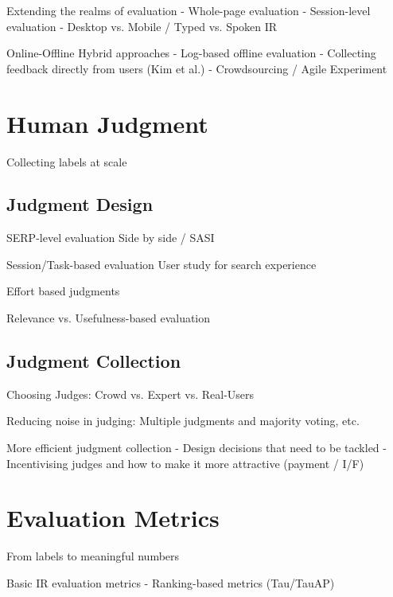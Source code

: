 \documentclass[openany]{now} %
\begin{document}

Extending the realms of evaluation
-	Whole-page evaluation
-	Session-level evaluation
-	Desktop vs. Mobile / Typed vs. Spoken IR
\cite{Bailey2010} \cite{Thomas2006} \cite{CarteretteBCD08}

Online-Offline Hybrid approaches
- Log-based offline evaluation \cite{Li:2015} \cite{li2010contextual}
- Collecting feedback directly from users (Kim et al.)
- Crowdsourcing / Agile Experiment

\chapter{Human Judgment}
Collecting labels at scale

\section{Judgment Design}

SERP-level evaluation 
Side by side / SASI
\cite{Thomas2006}
\cite{Chandar2013} \cite{Al-Maskari2007} 
\cite{Bailey2010} \cite{CarteretteBCD08}

Session/Task-based evaluation
User study for search experience

Effort based judgments \cite{Yilmaz:2014}

Relevance vs. Usefulness-based evaluation 

\section{Judgment Collection}

Choosing Judges: 
Crowd vs. Expert vs. Real-Users \cite{Scholer:2013} \cite{Kazai:2013} \cite{Alonso20121053}

Reducing noise in judging: 
Multiple judgments and majority voting, etc. \cite{Venanzi:2014}

More efficient judgment collection
-	Design decisions that need to be tackled  \cite{Blanco:2011} \cite{Kazai2012} \cite{Alonso2012} \cite{Alonso:2015}
-	Incentivising judges and how to make it more attractive (payment / I/F)
\cite{Megorskaya2015} \cite{Davtyan2015}  \cite{Rokicki:2014}  \cite{Eickhoff:2012}

\chapter{Evaluation Metrics}
From labels to meaningful numbers


Basic IR evaluation metrics 
-	Ranking-based metrics (Tau/TauAP)
\end{document}

